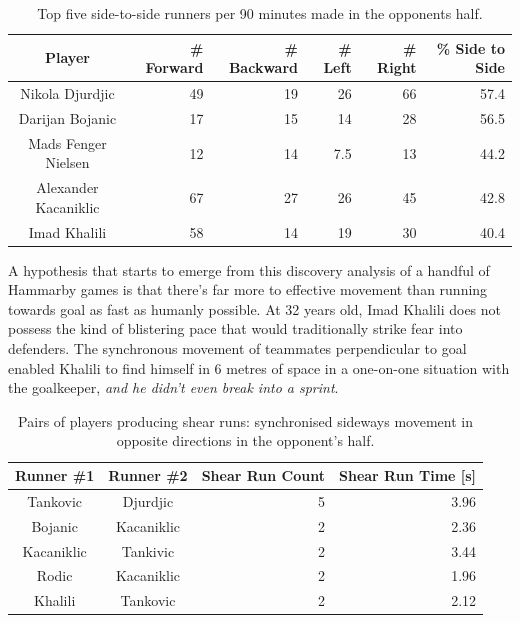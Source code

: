 \documentclass[twocolumn,prl,nobalancelastpage,aps,10pt]{revtex4-1}
\begin{document}
\begin{table}[h!]
\begin{tabular}{|c|r|r|r|r|r|}
\hline
\toprule
            Player &     \# Forward &     \# Backward &     \# Left &     \# Right &  \% Side to Side \\
\hline
\midrule
      Nikola Djurdjic &  49 &  19 &  26 &  66 &          57.4 \\
      Darijan Bojanic &  17 &  15 &  14 &  28 &          56.5 \\
  Mads Fenger Nielsen &  12 &  14 &   7.5 &  13 &          44.2 \\
 Alexander Kacaniklic &  67 &  27 &  26 &  45 &          42.8 \\
Imad Khalili &  58 &  14 &  19 &  30 &          40.4 \\
\bottomrule
\hline
\end{tabular}
\caption{Top five side-to-side runners per 90 minutes made in the opponents half.}
\label{sidetoside}
\end{table}

A hypothesis that starts to emerge from this discovery analysis of a handful of Hammarby games is that there's far more to effective movement than running towards goal as fast as humanly possible. At 32 years old, Imad Khalili does not possess the kind of blistering pace that would traditionally strike fear into defenders. The synchronous movement of teammates perpendicular to goal enabled Khalili to find himself in 6 metres of space in a one-on-one situation with the goalkeeper, \textit{and he didn't even break into a sprint}.

\begin{table}[h!]
\begin{tabular}{|c|c|r|r|}
\hline
\toprule
 Runner \#1 &  Runner \#2 &  Shear Run Count &  Shear Run Time [s] \\
\hline
\midrule
                 Tankovic & Djurdjic &                  5 &           3.96 \\
                  Bojanic &                   Kacaniklic &                  2 &           2.36 \\
                 Kacaniklic &                   Tankivic &                  2 &           3.44 \\
                 Rodic &                   Kacaniklic &                  2 &           1.96 \\
                  Khalili &                   Tankovic &                  2 &           2.12 \\
\bottomrule
\hline
\end{tabular}
\caption{Pairs of players producing shear runs: synchronised sideways movement in opposite directions in the opponent's half.}
\label{shears}
\end{table}
\end{document}
